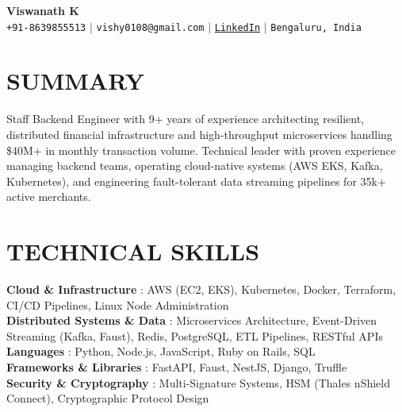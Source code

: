\documentclass[letterpaper,11pt]{article}
\begin{document}
\begin{center}
    \textbf{\Huge Viswanath K} \\ \vspace{5pt}
    \small \faPhone* \texttt{+91-8639855513} \hspace{1pt} $|$
    \hspace{1pt} \faEnvelope \hspace{2pt} \texttt{vishy0108@gmail.com} \hspace{1pt} $|$
    \hspace{1pt} \faLinkedin \hspace{2pt} \texttt{\href{https://www.linkedin.com/in/viswanath-k-5852a3143/}{LinkedIn}} \hspace{1pt} $|$
    \hspace{1pt} \faMapMarker* \hspace{2pt}\texttt{Bengaluru, India}
    \\ \vspace{-3pt}
\end{center}

\section{SUMMARY}
  \small{Staff Backend Engineer with 9+ years of experience architecting resilient, distributed financial infrastructure and high-throughput microservices handling \$40M+ in monthly transaction volume. Technical leader with proven experience managing backend teams, operating cloud-native systems (AWS EKS, Kafka, Kubernetes), and engineering fault-tolerant data streaming pipelines for 35k+ active merchants.}

\section{TECHNICAL SKILLS}
 \begin{itemize}[leftmargin=0in, label={}]
    \small{\item{
     \textbf{Cloud \& Infrastructure} {: AWS (EC2, EKS), Kubernetes, Docker, Terraform, CI/CD Pipelines, Linux Node Administration} \vspace{2pt} \\
     \textbf{Distributed Systems \& Data} {: Microservices Architecture, Event-Driven Streaming (Kafka, Faust), Redis, PostgreSQL, ETL Pipelines, RESTful APIs} \vspace{2pt} \\
     \textbf{Languages} {: Python, Node.js, JavaScript, Ruby on Rails, SQL} \vspace{2pt} \\
     \textbf{Frameworks \& Libraries} {: FastAPI, Faust, NestJS, Django, Truffle} \vspace{2pt} \\
     \textbf{Security \& Cryptography} {: Multi-Signature Systems, HSM (Thales nShield Connect), Cryptographic Protocol Design}
    }}
 \end{itemize}
\end{document}
